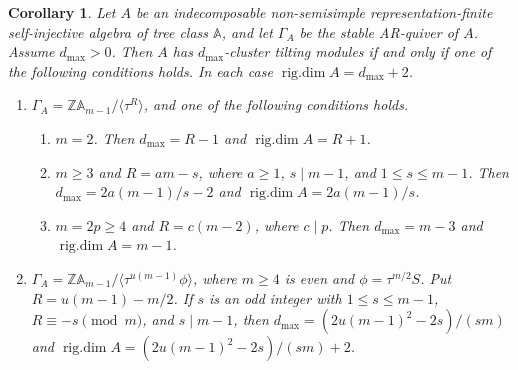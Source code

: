 \documentclass[12pt]{article}
\theoremstyle{plain}
\newtheorem{Coro}[Def]{Corollary}
\theoremstyle{definition}
\DeclareMathOperator{\rigdim}{rig.dim}
\renewcommand{\leq}{\leqslant}
\renewcommand{\geq}{\geqslant}
\begin{document}
\begin{Coro} 
\label{coro-rigdim-type-A-closed-families}
Let \(A\) be an indecomposable non-semisimple representation-finite
self-injective algebra of tree class \(\mathbb A\), and let \(\Gamma_A\) be
the stable AR-quiver of \(A\).  Assume \(d_{\max}>0\).  Then \(A\) has
\(d_{\max}\)-cluster tilting modules if and only if one of the following
conditions holds.  In each case  \(\rigdim A=d_{\max}+2\).

\begin{enumerate}[label={\rm(A\arabic*)}]
\item \(\Gamma_A=\mathbb Z\mathbb A_{m-1}/\langle\tau^R\rangle\), and one of
the following conditions holds.
\begin{enumerate}[label={\rm(\alph*)}]
\item \(m=2\).  Then \(d_{\max}=R-1\) and \(\rigdim A=R+1\).
\item \(m\geq3\) and \(R=am-s\), where \(a\geq1\), \(s\mid m-1\), and
\(1\leq s\leq m-1\).  Then
\(d_{\max}=2a(m-1)/s-2\) and \(\rigdim A=2a(m-1)/s\).
\item \(m=2p\geq4\) and \(R=c(m-2)\), where \(c\mid p\).  Then
\(d_{\max}=m-3\) and \(\rigdim A=m-1\).
\end{enumerate}
\item \(\Gamma_A=\mathbb Z\mathbb A_{m-1}/
\langle\tau^{u(m-1)}\phi\rangle\), where \(m\geq4\) is even and
\(\phi=\tau^{m/2}S\).  Put \(R=u(m-1)-m/2\).  If \(s\) is an odd integer with
\(1\leq s\leq m-1\), \(R\equiv -s\pmod m\), and \(s\mid m-1\), then
\(d_{\max}=(2u(m-1)^2-2s)/(sm)\) and
\(\rigdim A=(2u(m-1)^2-2s)/(sm)+2\).
\end{enumerate}
\end{Coro}
\end{document}
